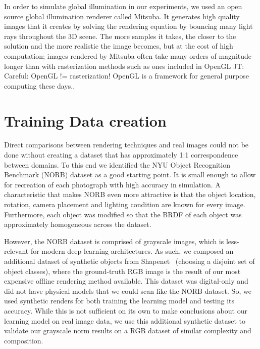 \documentclass[10pt,twocolumn,letterpaper]{article}
\newcommand{\tompson}[1]{{\color{green} JT: #1}}
\begin{document}
In order to simulate global illumination in our experiments, we used an open source global illumination renderer called Mitsuba\cite{Mitsuba}.  It generates high quality images that it creates by solving the rendering equation
by bouncing many light rays throughout the 3D scene.  The more samples it takes, the closer to the solution and the more realistic the image becomes, but at the cost of high computation; images rendered by Mitsuba often take many orders of magnitude longer than with rasterization methods such as ones included in OpenGL \tompson{Careful: OpenGL != rasterization! OpenGL is a framework for general purpose computing these days.}.  

\section{Training Data creation}
Direct comparisons between rendering techniques and real images could not be done without creating a dataset that has approximately 1:1 correspondence between domains.  To this end we identified the NYU Object Recognition Benchmark (NORB) dataset \cite{LeCun:2004:LMG:1896300.1896315} as a good starting point. It is small enough to allow for recreation of each photograph with high accuracy in simulation.  A characteristic that makes NORB even more attractive is that the object location, rotation, camera placement and lighting condition are known for every image. Furthermore, each object was modified so that the BRDF of each object was approximately homogeneous across the dataset.

However, the NORB dataset is comprised of grayscale images, which is less-relevant for modern deep-learning architectures. As such, we composed an additional dataset of synthetic objects from Shapenet~\cite{DBLP:journals/corr/ChangFGHHLSSSSX15} (choosing a disjoint set of object classes), where the ground-truth RGB image is the result of our most expensive offline rendering method available. This dataset was digital-only and did not have physical models that we could scan like the NORB dataset. So, we used synthetic renders for both training the learning model and testing its accuracy. %
While this is not sufficient on its own to make conclusions about our learning model on real image data, we use this additional synthetic dataset to validate our grayscale norm results on a RGB dataset of similar complexity and composition. %
\end{document}
